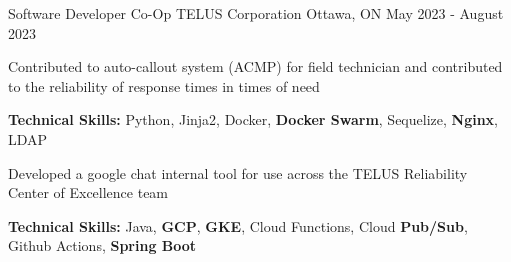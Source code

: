 

\begin{cventries}

  \cventry
    {Software Developer Co-Op} %
    {TELUS Corporation} %
    {Ottawa, ON} %
    {May 2023 - August 2023} %
    {
      \begin{cvitems} %
        \item {Contributed to auto-callout system (ACMP) for field technician and contributed to the reliability of response times in times of need}
          \item[] {\textbf{Technical Skills:} Python, Jinja2, Docker, \textbf{Docker Swarm}, Sequelize, \textbf{Nginx}, LDAP}
        \item {Developed a google chat internal tool for use across the TELUS Reliability Center of Excellence team}
          \item[] {\textbf{Technical Skills:} Java, \textbf{GCP}, \textbf{GKE}, Cloud Functions, Cloud \textbf{Pub/Sub}, Github Actions, \textbf{Spring Boot}}
      \end{cvitems}
    }



\end{cventries}

